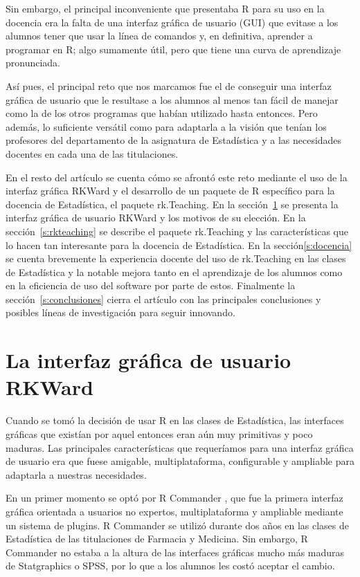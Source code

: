 \documentclass[a4paper,10pt,twoside]{article}
\newcommand{\rkteaching}{\textsf{rk.Teaching}}
\newcommand{\rkward}{\textsf{RKWard}}
\newcommand{\spss}{\textsf{SPSS}}
\newcommand{\statgraphics}{\textsf{Statgraphics}}
\newcommand{\rcommander}{\textsf{R Commander}}
\begin{document}
Sin embargo, el principal inconveniente que presentaba R para su uso en la docencia era la falta de una interfaz
gráfica de usuario (GUI) que evitase a los alumnos tener que usar la línea de comandos y, en definitiva, aprender a
programar en R; algo sumamente útil, pero que tiene una curva de aprendizaje pronunciada. 

Así pues, el principal reto que nos marcamos fue el de conseguir una interfaz gráfica de usuario que le resultase a los
alumnos al menos tan fácil de manejar como la de los otros programas que habían utilizado hasta entonces.
Pero además, lo suficiente versátil como para adaptarla a la visión que tenían los profesores del departamento de la
asignatura de Estadística y a las necesidades docentes en cada una de las titulaciones.

En el resto del artículo se cuenta cómo se afrontó este reto mediante el uso de la interfaz gráfica \rkward{} y el
desarrollo de un paquete de R específico para la docencia de Estadística, el paquete \rkteaching. 
En la sección~\ref{s:rkward} se presenta la interfaz gráfica de usuario \rkward{} y los motivos de su elección. 
En la sección~\ref{s:rkteaching} se describe el paquete \rkteaching{} y las características que lo hacen tan interesante
para la docencia de Estadística. 
En la sección\ref{s:docencia} se cuenta brevemente la experiencia docente del uso de rk.Teaching en las clases de
Estadística y la notable mejora tanto en el aprendizaje de los alumnos como en la eficiencia de uso del software por
parte de estos. 
Finalmente la sección~\ref{s:conclusiones} cierra el artículo con las principales conclusiones y posibles líneas de
investigación para seguir innovando.


\section{La interfaz gráfica de usuario \rkward}
\label{s:rkward}
Cuando se tomó la decisión de usar R en las clases de Estadística, las interfaces gráficas que existían por aquel
entonces eran aún muy primitivas y poco maduras.
Las principales características que requeríamos para una interfaz gráfica de usuario era que fuese amigable,
multiplataforma, configurable y ampliable para adaptarla a nuestras necesidades.

En un primer momento se optó por \rcommander{} \cite{fox2005r}, que fue la primera interfaz gráfica orientada a
usuarios no expertos, multiplataforma y ampliable mediante un sistema de plugins.
\rcommander{} se utilizó durante dos años en las clases de Estadística de las titulaciones de Farmacia y
Medicina.
Sin embargo, \rcommander{} no estaba a la altura de las interfaces gráficas mucho más maduras de \statgraphics{} o
\spss{}, por lo que a los alumnos les costó aceptar el cambio. 
\end{document}
